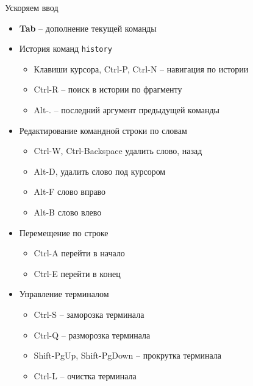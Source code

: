 \begin{frame}{Ускоряем ввод}
  \begin{itemize}
    \item \textbf{Tab} -- дополнение текущей команды
      \pause
    \item История команд \alert{{\tt history}}
      \begin{itemize}
        \item Клавиши курсора, \alert{Ctrl-P}, Ctrl-N -- навигация по истории
        \item \alert{Ctrl-R} -- поиск в истории по фрагменту
        \item \alert{Alt-.}  -- последний аргумент предыдущей команды
      \end{itemize}
      \pause
    \item Редактирование командной строки по словам
      \begin{itemize}
        \item \alert{Ctrl-W}, Ctrl-Backspace удалить слово, назад
        \item \alert{Alt-D}, удалить слово под курсором 
        \item \alert{Alt-F} слово вправо
        \item \alert{Alt-B} слово влево
      \end{itemize}
      \pause
    \item Перемещение по строке
      \begin{itemize}
        \item \alert{Ctrl-A} перейти в начало 
        \item \alert{Ctrl-E} перейти в конец
      \end{itemize}
      \pause
    \item Управление терминалом
      \begin{itemize}
        \item Ctrl-S -- заморозка терминала
        \item Ctrl-Q -- разморозка терминала
        \item Shift-PgUp, Shift-PgDown -- прокрутка терминала
        \item \alert{Ctrl-L} -- очистка терминала
      \end{itemize}
  \end{itemize}
\end{frame}


